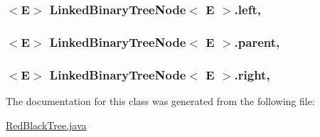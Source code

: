 \subsubsection[{\texorpdfstring{left}{left}}]{$<$E$>$ {\bf Linked\+Binary\+Tree\+Node}$<$ E $>$.left\hspace{0.3cm}{\ttfamily [protected]}, {\ttfamily [inherited]}}\hypertarget{class_linked_binary_tree_node_aa3fac51a9f33d5a5f6e65c0097bbadcb}{}\label{class_linked_binary_tree_node_aa3fac51a9f33d5a5f6e65c0097bbadcb}
\subsubsection[{\texorpdfstring{parent}{parent}}]{$<$E$>$ {\bf Linked\+Binary\+Tree\+Node}$<$ E $>$.parent\hspace{0.3cm}{\ttfamily [protected]}, {\ttfamily [inherited]}}\hypertarget{class_linked_binary_tree_node_a9781f783b1c6cda7f89339709a76a903}{}\label{class_linked_binary_tree_node_a9781f783b1c6cda7f89339709a76a903}
\subsubsection[{\texorpdfstring{right}{right}}]{$<$E$>$ {\bf Linked\+Binary\+Tree\+Node}$<$ E $>$.right\hspace{0.3cm}{\ttfamily [protected]}, {\ttfamily [inherited]}}\hypertarget{class_linked_binary_tree_node_a9caa5da4b6af168516202a3f38c36cc7}{}\label{class_linked_binary_tree_node_a9caa5da4b6af168516202a3f38c36cc7}


The documentation for this class was generated from the following file\+:\begin{DoxyCompactItemize}
\item 
\hyperlink{_red_black_tree_8java}{Red\+Black\+Tree.\+java}\end{DoxyCompactItemize}
